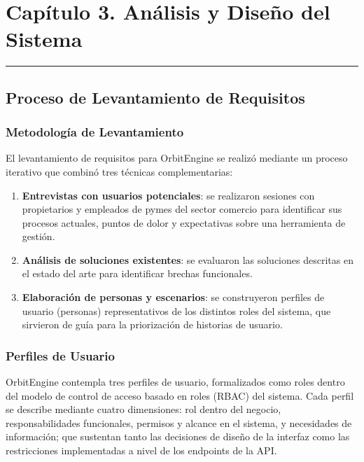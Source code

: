 \chapter{Capítulo 3. Análisis y Diseño del Sistema}\label{capuxedtulo-3.-anuxe1lisis-y-diseuxf1o-del-sistema}

\begin{center}\rule{0.5\linewidth}{0.5pt}\end{center}

\section{Proceso de Levantamiento de Requisitos}\label{proceso-de-levantamiento-de-requisitos}

\subsection{Metodología de Levantamiento}\label{metodologuxeda-de-levantamiento}

El levantamiento de requisitos para OrbitEngine se realizó mediante un proceso iterativo que combinó tres técnicas complementarias:

\begin{enumerate}
\def\labelenumi{\arabic{enumi}.}
\tightlist
\item
  \textbf{Entrevistas con usuarios potenciales}: se realizaron sesiones con propietarios y empleados de pymes del sector comercio para identificar sus procesos actuales, puntos de dolor y expectativas sobre una herramienta de gestión.
\item
  \textbf{Análisis de soluciones existentes}: se evaluaron las soluciones descritas en el estado del arte para identificar brechas funcionales.
\item
  \textbf{Elaboración de personas y escenarios}: se construyeron perfiles de usuario (personas) representativos de los distintos roles del sistema, que sirvieron de guía para la priorización de historias de usuario.
\end{enumerate}

\subsection{Perfiles de Usuario}\label{perfiles-de-usuario}

OrbitEngine contempla tres perfiles de usuario, formalizados como roles dentro del modelo de control de acceso basado en roles (RBAC) del sistema. Cada perfil se describe mediante cuatro dimensiones: rol dentro del negocio, responsabilidades funcionales, permisos y alcance en el sistema, y necesidades de información; que sustentan tanto las decisiones de diseño de la interfaz como las restricciones implementadas a nivel de los endpoints de la API.

